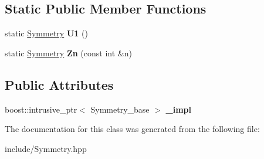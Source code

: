 \subsection*{Static Public Member Functions}
\begin{DoxyCompactItemize}
\item 
\mbox{\label{classcytnx_1_1Symmetry_a9218fd66fc9cca64cd3d792e0019592a}} 
static \hyperlink{classcytnx_1_1Symmetry}{Symmetry} {\bfseries U1} ()
\item 
\mbox{\label{classcytnx_1_1Symmetry_a066083aa705f8fc749b3bbb606f89359}} 
static \hyperlink{classcytnx_1_1Symmetry}{Symmetry} {\bfseries Zn} (const int \&n)
\end{DoxyCompactItemize}
\subsection*{Public Attributes}
\begin{DoxyCompactItemize}
\item 
\mbox{\label{classcytnx_1_1Symmetry_a8306cca4c4faae52a9592e5551f80ac0}} 
boost\+::intrusive\+\_\+ptr$<$ Symmetry\+\_\+base $>$ {\bfseries \+\_\+impl}
\end{DoxyCompactItemize}


The documentation for this class was generated from the following file\+:\begin{DoxyCompactItemize}
\item 
include/Symmetry.\+hpp\end{DoxyCompactItemize}
